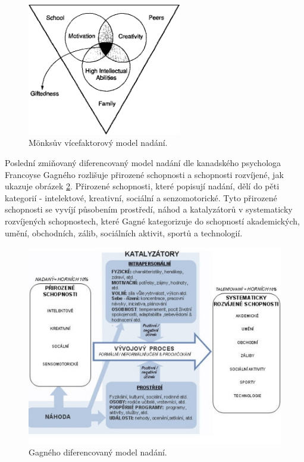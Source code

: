 \documentclass[a4paper]{scrartcl}
\begin{document}
        \begin{figure}
            \centering
            \includegraphics[width=0.6\textwidth]{monks_model.png}
            \caption{Mönksův vícefaktorový model nadání.\cite{monks_model_fig}}
            \label{fig:monks_model}
        \end{figure}

Poslední zmiňovaný diferencovaný model nadání dle kanadského psychologa Francoyse Gagného rozlišuje přirozené schopnosti a schopnosti rozvíjené, jak ukazuje obrázek \ref{fig:gagne_model}. Přirozené schopnosti, které popisují nadání, dělí do pěti kategorií - intelektové, kreativní, sociální a senzomotorické. Tyto přirozené schopnosti se vyvíjí působením prostředí, náhod a katalyzátorů v systematicky rozvíjených schopnostech, které Gagné kategorizuje do schopností akademických, umění, obchodních, zálib, sociálních aktivit, sportů a technologií.\cite{gagne_model_fig}\\

        \begin{figure}
            \centering
            \includegraphics[width=\textwidth]{gagne_model.jpg}
            \caption{Gagného diferencovaný model nadání.\cite{gagne_model_fig}}
            \label{fig:gagne_model}
        \end{figure}
\end{document}
